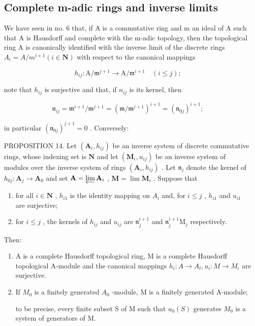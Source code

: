 \subsection{Complete m-adic rings and inverse limits}

We have seen in no. 6 that, if A is a commutative ring and m an ideal of A such that A is Hausdorff and complete with the m-adic topology, then the topological ring A is canonically identified with the inverse limit of the discrete rings \(A_{i} = A/m^{i+1} (i \in \mathbf{N})\) with respect to the canonical mappings

\[
h _ {i j} \colon \mathrm{A} / \mathfrak {m} ^ {j + 1} \rightarrow \mathrm{A} / \mathfrak {m} ^ {i + 1} \quad (i \leqslant j);
\]

note that \(h_{ij}\) is surjective and that, if \(n_{ij}\) is its kernel, then

\[
\mathfrak {n} _ {i j} = \mathfrak {m} ^ {i + 1} / \mathfrak {m} ^ {j + 1} = (\mathfrak {m} / \mathfrak {m} ^ {j + 1}) ^ {i + 1} = (\mathfrak {n} _ {0 j}) ^ {i + 1};
\]

in particular \((\mathfrak{n}_{0j})^{j + 1} = 0\) . Conversely:

PROPOSITION 14. Let \((\mathbf{A}_i, h_{ij})\) be an inverse system of discrete commutative rings, whose indexing set is \(\mathbf{N}\) and let \((\mathbf{M}_i, u_{ij})\) be an inverse system of modules over the inverse system of rings \((\mathbf{A}_i, h_{ij})\) . Let \(\mathfrak{n}_j\) denote the kernel of \(h_{0j} \colon \mathbf{A}_j \to \mathbf{A}_0\) and set \(\mathbf{A} = \varprojlim \mathbf{A}_i\) , \(\mathbf{M} = \lim \mathbf{M}_i\) . Suppose that

\begin{enumerate}
\def\labelenumi{(\alph{enumi})}
\item
  for all \(i \in \mathbf{N}\) , \(h_{i1}\) is the identity mapping on \(A_i\) and, for \(i \leqslant j\) , \(h_{i1}\) and \(u_{i1}\) are surjective;
\item
  for \(i \leqslant j\) , the kernels of \(h_{ij}\) and \(u_{ij}\) are \(\mathfrak{n}_j^{i+1}\) and \(\mathfrak{n}_j^{i+1}\mathrm{M}_j\) respectively.
\end{enumerate}

Then:

\begin{enumerate}
\def\labelenumi{(\roman{enumi})}
\item
  A is a complete Hausdorff topological ring, M is a complete Hausdorff topological A-module and the canonical mappings \(h_{i}: A \to A_{t}, u_{i}: M \to M_{i}\) are surjective.
\item
  If \(M_{0}\) is a finitely generated \(A_{0}\) -module, M is a finitely generated A-module;

to be precise, every finite subset S of M such that \(u_{0}(S)\) generates \(M_{0}\) is a system of generators of M.
\end{enumerate}

